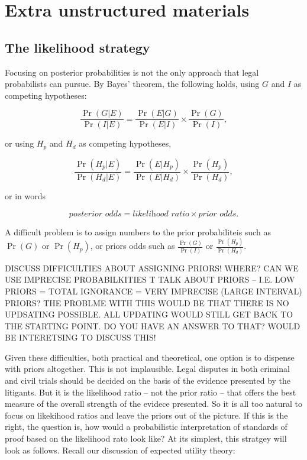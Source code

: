 \documentclass[10pt,dvipsnames,enabledeprecatedfontcommands]{scrartcl}
\begin{document}
\section{Extra unstructured
materials}\label{extra-unstructured-materials}

\subsection{The likelihood strategy}\label{the-likelihood-strategy}

Focusing on posterior probabilities is not the only approach that legal
probabilists can pursue. By Bayes' theorem, the following holds, using
\(G\) and \(I\) as competing hypotheses:

\[ \frac{\Pr(G | E)}{\Pr(I | E)} = \frac{\Pr(E | G)}{\Pr(E | I)} \times \frac{\Pr(G)}{\Pr(I)},\]

or using \(H_p\) and \(H_d\) as competing hypotheses,

\[ \frac{\Pr(H_p | E)}{\Pr(H_d | E)} = \frac{\Pr(E | H_p)}{\Pr(E | H_d)} \times \frac{\Pr(H_p)}{\Pr(H_d)},\]

or in words

\[ \textit{posterior odds} = \textit{likelihood ratio} \times \textit{prior odds}.\]

A difficult problem is to assign numbers to the prior probabiliteis such
as \(\Pr(G)\) or \(\Pr(H_p)\), or priors odds such as
\(\frac{\Pr(G)}{\Pr(I)}\) or \(\frac{\Pr(H_p)}{\Pr(H_d)}\).

DISCUSS DIFFICULTIES ABOUT ASSIGNING PRIORS! WHERE? CAN WE USE IMPRECISE
PROBABILKITIES T TALK ABOUT PRIORS -- I.E. LOW PRIORS = TOTAL IGNORANCE
= VERY IMPRECISE (LARGE INTERVAL) PRIORS? THE PROBLME WITH THIS WOULD BE
THAT THERE IS NO UPDSATING POSSIBLE. ALL UPDATING WOULD STILL GET BACK
TO THE STARTING POINT. DO YOU HAVE AN ANSWER TO THAT? WOULD BE
INTERETSING TO DISCUSS THIS!

Given these difficulties, both practical and theoretical, one option is
to dispense with priors altogether. This is not implausible. Legal
disputes in both criminal and civil trials should be decided on the
basis of the evidence presented by the litigants. But it is the
likelihood ratio -- not the prior ratio -- that offers the best measure
of the overall strength of the evidece presented. So it is all too
natural to focus on likekihood ratios and leave the priors out of the
picture. If this is the right, the question is, how would a
probabilistic interpretation of standards of proof based on the
likelihood rato look like? At its simplest, this stratgey will look as
follows. Recall our discussion of expected utility theory:
\end{document}
